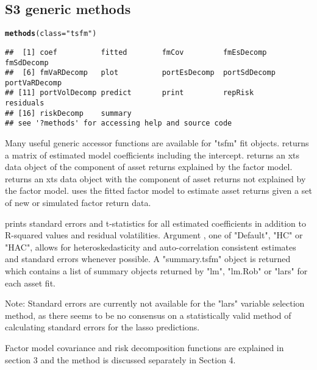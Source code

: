 \documentclass[a4paper]{article}\usepackage[]{graphicx}\usepackage[]{color}
\makeatletter
\newcommand{\hlstr}[1]{\textcolor[rgb]{0.192,0.494,0.8}{#1}}%
\newcommand{\hlstd}[1]{\textcolor[rgb]{0.345,0.345,0.345}{#1}}%
\newcommand{\hlkwc}[1]{\textcolor[rgb]{0.333,0.667,0.333}{#1}}%
\newcommand{\hlkwd}[1]{\textcolor[rgb]{0.737,0.353,0.396}{\textbf{#1}}}%
\newenvironment{kframe}{%
 \def\at@end@of@kframe{}%
 \ifinner\ifhmode%
  \def\at@end@of@kframe{\end{minipage}}%
  \begin{minipage}{\columnwidth}%
 \fi\fi%
 \def\FrameCommand##1{\hskip\@totalleftmargin \hskip-\fboxsep
 \colorbox{shadecolor}{##1}\hskip-\fboxsep
     \hskip-\linewidth \hskip-\@totalleftmargin \hskip\columnwidth}%
 \MakeFramed {\advance\hsize-\width
   \@totalleftmargin\z@ \linewidth\hsize
   \@setminipage}}%
 {\par\unskip\endMakeFramed%
 \at@end@of@kframe}
\newenvironment{knitrout}{}{} %
\makeatother
\begin{document}
\newpage
\subsection{S3 generic methods}

\begin{knitrout}
\color{fgcolor}\begin{kframe}
\begin{alltt}
\hlkwd{methods}\hlstd{(}\hlkwc{class}\hlstd{=}\hlstr{"tsfm"}\hlstd{)}
\end{alltt}
\begin{verbatim}
##  [1] coef          fitted        fmCov         fmEsDecomp    fmSdDecomp   
##  [6] fmVaRDecomp   plot          portEsDecomp  portSdDecomp  portVaRDecomp
## [11] portVolDecomp predict       print         repRisk       residuals    
## [16] riskDecomp    summary      
## see '?methods' for accessing help and source code
\end{verbatim}
\end{kframe}
\end{knitrout}

Many useful generic accessor functions are available for "tsfm" fit objects.  returns a matrix of estimated model coefficients including the intercept.  returns an xts data object of the component of asset returns explained by the factor model.  returns an xts data object with the component of asset returns not explained by the factor model. 
 uses the fitted factor model to estimate asset returns given a set of new or simulated factor return data.  

 prints standard errors and t-statistics for all estimated coefficients in addition to R-squared values and residual volatilities. Argument , one of "Default", "HC" or "HAC", allows for heteroskedasticity and auto-correlation consistent estimates and standard errors whenever possible. A "summary.tsfm" object is returned which contains a list of summary objects returned by "lm", "lm.Rob" or "lars" for each asset fit. 

Note: Standard errors are currently not available for the "lars" variable selection method, as there seems to be no consensus on a statistically valid method of calculating standard errors for the lasso predictions.

Factor model covariance and risk decomposition functions are explained in section 3 and the  method is discussed separately in Section 4.
\end{document}
